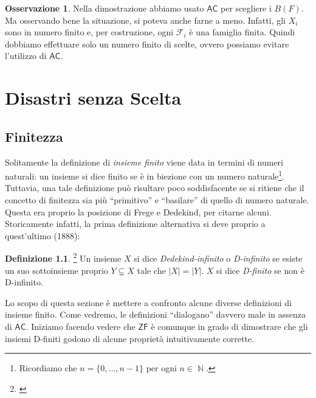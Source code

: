 \documentclass[12pt,a4paper]{report}
\theoremstyle{definition}
\newtheorem{defn}[teo]{Definizione}  %
\newtheorem{oss}[teo]{Osservazione}  %
\theoremstyle{num.custom-title}
\DeclareMathOperator{\N}{\mathbb{N}}
\newcommand{\AC}{\ensuremath{\mathsf{AC}}\xspace}
\newcommand{\ZF}{\ensuremath{\mathsf{ZF}}\xspace}
\begin{document}
\begin{oss}
Nella dimostrazione abbiamo usato \AC per scegliere i $B(F)$. Ma osservando bene la situazione, si poteva anche farne a meno. Infatti, gli $X_i$ sono in numero finito e, per costruzione, ogni $\mathcal{F}_i$ è una famiglia finita. Quindi dobbiamo effettuare solo un numero finito di scelte, ovvero possiamo evitare l'utilizzo di \AC.
\end{oss}




\chapter{Disastri senza Scelta}


\section{Finitezza}

Solitamente la definizione di \emph{insieme finito} viene data in termini di numeri naturali: un insieme si dice finito se è in biezione con un numero naturale\footnote{Ricordiamo che $n=\{0,...,n-1\}$ per ogni $n \in \N$.}. Tuttavia, una tale definizione può risultare poco soddisfacente se si ritiene che il concetto di finitezza sia più ``primitivo'' e ``basilare'' di quello di numero naturale. Questa era proprio la posizione di Frege e Dedekind, per citarne alcuni. Storicamente infatti, la prima definizione alternativa si deve proprio a quest'ultimo (1888):

\begin{defn}\footnote{\cite{Ded1888:Herrlich}}
Un insieme $X$ si dice \emph{Dedekind-infinito} o \emph{D-infinito} se esiste un suo sottoinsieme proprio $Y \subsetneq X$ tale che $|X|=|Y|$. $X$ si dice \emph{D-finito} se non è D-infinito.
\end{defn}

Lo scopo di questa sezione è mettere a confronto alcune diverse definizioni di insieme finito. Come vedremo, le definizioni ``dialogano'' davvero male in assenza di \AC. Iniziamo facendo vedere che \ZF è comunque in grado di dimostrare che gli insiemi D-finiti godono di alcune proprietà intuitivamente corrette.
\end{document}
